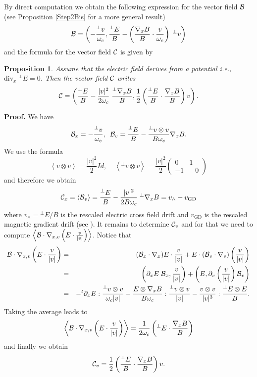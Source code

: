 \documentclass[12pt, a4paper]{article}
\newtheorem{pro}{Proposition}[section]
\newcounter{steps}
\newenvironment{proof}[1][]{%
\par\medbreak\setcounter{steps}{0}
{\noindent\bfseries Proof#1. }} {\hfill\fbox{\ }\medbreak}
\newcommand{\Divx}[0]{
\mathrm{div}_x}
\newcommand{\nxv}[0]{
\nabla_{x,v}}
\newcommand{\ave}[1]{
\left \langle #1 \right \rangle }
\begin{document}
By direct computation we obtain the following expression for the vector field ${\cal B}$ (see Proposition \ref{Step2Bis} for a more general result)
\begin{equation}
\label{Equ42} {\cal B} = \left ( - \frac{^\perp v}{\omega _c}, \frac{^\perp E}{B} - \left ( \frac{\nabla _x B}{B} \cdot \frac{v}{\omega _c} \right ) \;{^\perp v} \right)
\end{equation}
and the formula for the vector field ${\cal C}$ is given by
\begin{pro}
\label{CCoordinates} Assume that the electric field derives from a potential {\it i.e.,} $\Divx \;^\perp E = 0$. Then the vector field ${\cal C}$ writes
\begin{equation}
\label{Equ43} {\cal C} = \left (\frac{^\perp E}{B} - \frac{|v|^2}{2\omega _c} \;\frac{^\perp \nabla _x B}{B}, \frac{1}{2} \left (\frac{^\perp E}{B} \cdot \frac{\nabla _x B}{B}   \right ) v   \right ).
\end{equation}
\end{pro}
\begin{proof}
We have 
$$
{\cal B}_x  = - \frac{^\perp v}{\omega _c},\;\;{\cal B}_v = \frac{^\perp E}{B} - \frac{^\perp v \otimes v}{B \omega _c} \nabla _x B.
$$
We use the formula
\[
\ave{v \otimes v} = \frac{|v|^2}{2} Id,\;\;\;\;\ave{^\perp v \otimes v } = \frac{|v|^2}{2} \left (
\begin{array}{rrr}
0  &  1\\
-1 &\;\;\;   0
\end{array}
\right )
\]
and therefore we obtain
\[
{\cal C}_x = \ave{{\cal B}_v} = \frac{^\perp E}{B} - \frac{|v|^2}{2B \omega _c } \;^\perp \nabla _x B = v_\wedge + v_{\mathrm{GD}}
\]
where $v _\wedge = {^\perp E}/B$ is the rescaled electric cross field drift and $v_{\mathrm{GD}} $ is the rescaled magnetic gradient drift (see \cite{HazMei03}). It remains to determine ${\cal C}_v$ and for that we need to compute $\ave{{\cal B} \cdot \nxv \left ( E \cdot \frac{v}{|v|}  \right ) }$. Notice that 
\begin{eqnarray}
{\cal B } \cdot \nxv  \left ( E \cdot \frac{v}{|v|}  \right ) & = & ({\cal B}_x \cdot \nabla _x ) E \cdot \frac{v}{|v|} + E \cdot ( {\cal B}_v \cdot \nabla _v ) \left ( \frac{v}{|v|} \right ) \nonumber \\
& = & \left ( \partial _x E\; {\cal B}_x , \frac{v}{|v|} \right ) + \left ( E, \partial _v \left ( \frac{v}{|v|} \right ) {\cal B}_v  \right ) \nonumber \\
& = & - ^t \partial _x E : \frac{^\perp v \otimes v}{\omega _c |v|} - \frac{E \otimes \nabla _x B}{B \omega _c } : \frac{^\perp v \otimes v}{|v|} - \frac{v \otimes v}{|v|^3} : \frac{^\perp E \otimes E}{B}. \nonumber
\end{eqnarray}
Taking the average leads to
\[
\ave{{\cal B } \cdot \nxv  \left ( E \cdot \frac{v}{|v|}  \right )} = \frac{1}{2\omega _c} \left ( ^\perp E \cdot \frac{\nabla _x B}{B} \right )
\]
and finally we obtain
\[
{\cal C}_v = \frac{1}{2}\left ( \frac{^\perp E}{B} \cdot \frac{\nabla _x B}{B} \right )v.
\]
\end{proof}
\end{document}
